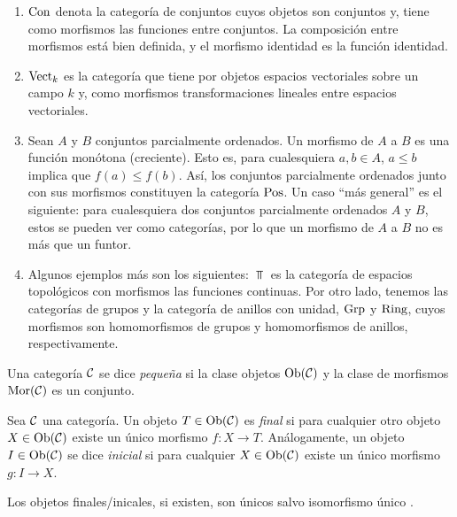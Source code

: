 \begin{ejp}
\text{ }
    \begin{enumerate}
        \item ${\mathrm{Con}}$ denota la categoría de conjuntos cuyos objetos son conjuntos y, tiene como morfismos las funciones entre conjuntos. La composición entre morfismos está bien definida, y el morfismo identidad es la función identidad. 
        \item ${\mathrm{Vect}}_k$ es la categoría que tiene por objetos espacios vectoriales sobre un campo $k$ y, como morfismos transformaciones lineales entre espacios vectoriales.
        \item Sean $A$ y $B$ conjuntos parcialmente ordenados. Un morfismo de $A$ a $B$ es una función monótona (creciente). Esto es, para cualesquiera $a,b\in A$, $a\leq b$ implica que $f(a)\leq f(b)$. Así, los conjuntos parcialmente ordenados junto con sus morfismos constituyen la categoría ${\mathrm{Pos}}$. Un caso ``más general'' es el siguiente: para cualesquiera dos conjuntos parcialmente ordenados $A$ y $B$, estos se pueden ver como categorías, por lo que un morfismo de $A$ a $B$ no es más que un funtor. 
        \item Algunos ejemplos más son los siguientes: $\Top$ es la categoría de espacios topológicos con morfismos las funciones continuas. Por otro lado, tenemos las categorías de grupos y la categoría de anillos con unidad, ${\mathrm{Grp}}$ y ${\mathrm{Ring}}$, cuyos morfismos son homomorfismos de grupos y homomorfismos de anillos, respectivamente. 
    \end{enumerate}
\end{ejp}
\begin{definition}
    Una categoría ${\mathcal C}$ se dice \emph{pequeña} si la clase objetos $\operatorname{Ob}({\mathcal C})$ y la clase de morfismos ${\mathrm{Mor}}({\mathcal C})$ es un conjunto.  
\end{definition}
\begin{definition} Sea ${\mathcal C}$ una categoría. Un objeto $T\in\operatorname{Ob}({\mathcal C})$ es \emph{final} si para cualquier otro objeto $X\in \operatorname{Ob}({\mathcal C})$ existe un único morfismo $f:X\to T$. Análogamente, un objeto $I\in\operatorname{Ob}({\mathcal C})$ se dice \emph{inicial} si para cualquier $X\in\operatorname{Ob}({\mathcal C})$ existe un único morfismo $g:I\to X$. 
\end{definition}
\begin{prop}
Los objetos finales/inicales, si existen, son únicos salvo 
isomorfismo único \cite{mac2013categories}.
\end{prop}
